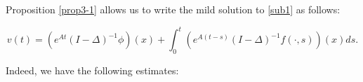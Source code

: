 \documentclass[10pt,a4paper,final]{article}
\numberwithin{equation}{section}
\newcommand{\Gb}{\beta}
\newcommand{\Gg}{\gamma}
\newcommand{\Gl}{\lambda}
\begin{document}

Proposition \ref{prop3-1} allows us to write the mild solution to \eqref{sub1} as follows:

$$v(t)=(e^{At}(I-\Delta)^{-1}\phi)(x)+\int_0^t(e^{A(t-s)}(I-\Delta)^{-1}f(\cdot,s))(x)ds.$$

Indeed, we have the following estimates:
\end{document}
